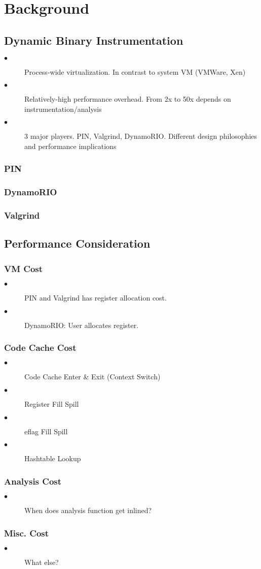 \section{Background}
\label{sec:background}
\subsection{Dynamic Binary Instrumentation}
\begin{description}
  \item[$\bullet$] Process-wide virtualization. In contrast to system VM (VMWare, Xen)
  \item[$\bullet$] Relatively-high performance overhead. From 2x to 50x depends on instrumentation/analysis
  \item[$\bullet$] 3 major players. PIN, Valgrind, DynamoRIO. Different design philosophies and performance implications
\end{description}
\subsubsection{PIN}
\subsubsection{DynamoRIO}
\subsubsection{Valgrind}
\subsection{Performance Consideration}
\subsubsection{VM Cost}
\begin{description}
  \item[$\bullet$] PIN and Valgrind has register allocation cost.
  \item[$\bullet$] DynamoRIO: User allocates register.
\end{description}
\subsubsection{Code Cache Cost}
\begin{description}
  \item[$\bullet$] Code Cache Enter \& Exit (Context Switch)
  \item[$\bullet$] Register Fill Spill
  \item[$\bullet$] eflag Fill Spill
  \item[$\bullet$] Hashtable Lookup
\end{description}
\subsubsection{Analysis Cost}
\begin{description}
  \item[$\bullet$] When does analysis function get inlined?
\end{description}
\subsubsection{Misc. Cost}
\begin{description}
  \item[$\bullet$] What else?
\end{description}
